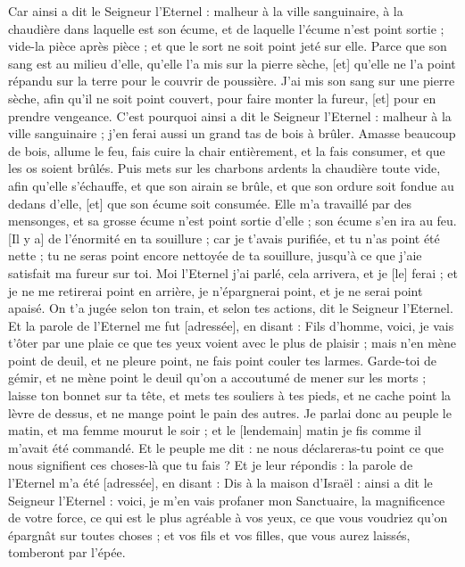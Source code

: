 \begin{multicols}{2}
Car ainsi a dit le Seigneur l'Eternel : malheur à la ville sanguinaire, à la chaudière dans laquelle est son écume, et de laquelle l'écume n'est point sortie ; vide-la pièce après pièce ; et que le sort ne soit point jeté sur elle.
Parce que son sang est au milieu d'elle, qu'elle l'a mis sur la pierre sèche, [et] qu'elle ne l'a point répandu sur la terre pour le couvrir de poussière.
J'ai mis son sang sur une pierre sèche, afin qu'il ne soit point couvert, pour faire monter la fureur, [et] pour en prendre vengeance.
C'est pourquoi ainsi a dit le Seigneur l'Eternel : malheur à la ville sanguinaire ; j'en ferai aussi un grand tas de bois à brûler.
Amasse beaucoup de bois, allume le feu, fais cuire la chair entièrement, et la fais consumer, et que les os soient brûlés.
Puis mets sur les charbons ardents la chaudière toute vide, afin qu'elle s'échauffe, et que son airain se brûle, et que son ordure soit fondue au dedans d'elle, [et] que son écume soit consumée.
Elle m'a travaillé par des mensonges, et sa grosse écume n'est point sortie d'elle ; son écume s'en ira au feu.
[Il y a] de l'énormité en ta souillure ; car je t'avais purifiée, et tu n'as point été nette ; tu ne seras point encore nettoyée de ta souillure, jusqu'à ce que j'aie satisfait ma fureur sur toi.
Moi l'Eternel j'ai parlé, cela arrivera, et je [le] ferai ; et je ne me retirerai point en arrière, je n'épargnerai point, et je ne serai point apaisé. On t'a jugée selon ton train, et selon tes actions, dit le Seigneur l'Eternel.
Et la parole de l'Eternel me fut [adressée], en disant :
Fils d'homme, voici, je vais t'ôter par une plaie ce que tes yeux voient avec le plus de plaisir ; mais n'en mène point de deuil, et ne pleure point, ne fais point couler tes larmes.
Garde-toi de gémir, et ne mène point le deuil qu'on a accoutumé de mener sur les morts ; laisse ton bonnet sur ta tête, et mets tes souliers à tes pieds, et ne cache point la lèvre de dessus, et ne mange point le pain des autres.
Je parlai donc au peuple le matin, et ma femme mourut le soir ; et le [lendemain] matin je fis comme il m'avait été commandé.
Et le peuple me dit : ne nous déclareras-tu point ce que nous signifient ces choses-là que tu fais ?
Et je leur répondis : la parole de l'Eternel m'a été [adressée], en disant :
Dis à la maison d'Israël : ainsi a dit le Seigneur l'Eternel : voici, je m'en vais profaner mon Sanctuaire, la magnificence de votre force, ce qui est le plus agréable à vos yeux, ce que vous voudriez qu'on épargnât sur toutes choses ; et vos fils et vos filles, que vous aurez laissés, tomberont par l'épée.

\end{multicols}
